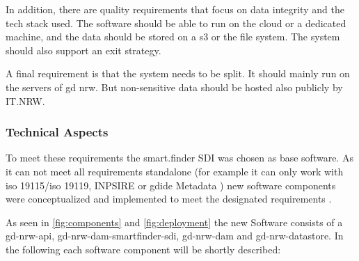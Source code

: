 \documentclass[11pt, titlepage, a4paper]{article}
\begin{document}
In addition, there are quality requirements that focus on data integrity and the tech stack used. The software should be able to run on the cloud or a dedicated machine, and the data should be stored on a \gls{s3} or the file system. The system should also support an exit strategy.

A final requirement is that the system needs to be split. It should mainly run on the servers of  \gls{gd} \gls {nrw}. But  non-sensitive data should be hosted also publicly by IT.NRW.

\subsubsection{Technical Aspects}
To meet these requirements the smart.finder SDI was chosen as base software. As it can not meet all requirements standalone (for example it can only work with \gls{iso} 19115/\gls{iso} 19119, INPSIRE \cite{temporarymiwp2021-2024sub-group2.3.1TechnicalGuidanceImplementation} or \gls{gdide} Metadata \cite{gdi-dearbeitskreismetadatenArchitekturGeodateninfrastrukturDeutschlandKonventionen}) new software components were conceptualized and implemented to meet the designated requirements \cite{conterraSmartFinderSDI}.



As seen in \ref{fig:components} and \ref{fig:deployment} the new Software consists of a gd-nrw-api, gd-nrw-dam-smartfinder-sdi, gd-nrw-dam and gd-nrw-datastore.
In the following each software component will be shortly described:
\end{document}

